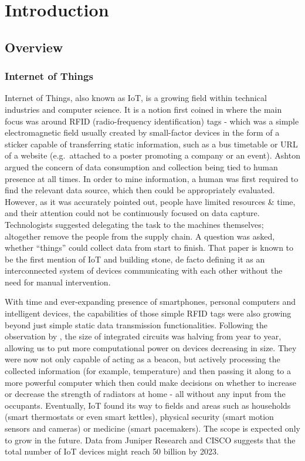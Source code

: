 \chapter{Introduction\label{chap:introduction}}

\section{Overview}
\subsection{Internet of Things}
Internet of Things, also known as IoT, is a growing field within technical industries and computer science. It is a notion first coined in \citet{ashton1999introduction} where the main focus was around RFID (radio-frequency identification) tags - which was a simple electromagnetic field usually created by small-factor devices in the form of a sticker capable of transferring static information, such as a bus timetable or URL of a website (e.g.\ attached to a poster promoting a company or an event). Ashton argued the concern of data consumption and collection being tied to human presence at all times. In order to mine information, a human was first required to find the relevant data source, which then could be appropriately evaluated. However, as it was accurately pointed out, people have limited resources \& time, and their attention could not be continuously focused on data capture. Technologists suggested delegating the task to the machines themselves; altogether remove the people from the supply chain. A question was asked, whether ``things'' could collect data from start to finish. That paper is known to be the first mention of IoT and building stone, de facto defining it as an interconnected system of devices communicating with each other without the need for manual intervention.

With time and ever-expanding presence of smartphones, personal computers and intelligent devices, the capabilities of those simple RFID tags were also growing beyond just simple static data transmission functionalities. Following the observation by \citet{moore1965cramming}, the size of integrated circuits was halving from year to year, allowing us to put more computational power on devices decreasing in size. They were now not only capable of acting as a beacon, but actively processing the collected information (for example, temperature) and then passing it along to a more powerful computer which then could make decisions on whether to increase or decrease the strength of radiators at home - all without any input from the occupants. Eventually, IoT found its way to fields and areas such as households (smart thermostats or even smart kettles), physical security (smart motion sensors and cameras) or medicine (smart pacemakers). The scope is expected only to grow in the future. Data from Juniper Research \cite{sorrel2018internet} and CISCO \cite{evans2011internet} suggests that the total number of IoT devices might reach 50 billion by 2023.

